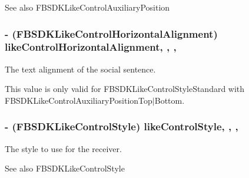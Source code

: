 \begin{DoxySeeAlso}{See also}
F\+B\+S\+D\+K\+Like\+Control\+Auxiliary\+Position 
\end{DoxySeeAlso}
\hypertarget{interface_f_b_s_d_k_like_control_a09b382f7e6805a15fc7eaeaa0ebb8788}{}
\subsubsection[{like\+Control\+Horizontal\+Alignment}]{\setlength{\rightskip}{0pt plus 5cm}-\/ (F\+B\+S\+D\+K\+Like\+Control\+Horizontal\+Alignment) like\+Control\+Horizontal\+Alignment\hspace{0.3cm}{\ttfamily [read]}, {\ttfamily [write]}, {\ttfamily [nonatomic]}, {\ttfamily [assign]}}\label{interface_f_b_s_d_k_like_control_a09b382f7e6805a15fc7eaeaa0ebb8788}
The text alignment of the social sentence.

This value is only valid for F\+B\+S\+D\+K\+Like\+Control\+Style\+Standard with F\+B\+S\+D\+K\+Like\+Control\+Auxiliary\+Position\+Top$\vert$\+Bottom. \hypertarget{interface_f_b_s_d_k_like_control_a4e8264601868efeebbbb247892f95240}{}
\subsubsection[{like\+Control\+Style}]{\setlength{\rightskip}{0pt plus 5cm}-\/ (F\+B\+S\+D\+K\+Like\+Control\+Style) like\+Control\+Style\hspace{0.3cm}{\ttfamily [read]}, {\ttfamily [write]}, {\ttfamily [nonatomic]}, {\ttfamily [assign]}}\label{interface_f_b_s_d_k_like_control_a4e8264601868efeebbbb247892f95240}
The style to use for the receiver.

\begin{DoxySeeAlso}{See also}
F\+B\+S\+D\+K\+Like\+Control\+Style 
\end{DoxySeeAlso}
\hypertarget{interface_f_b_s_d_k_like_control_a19bcd198e1f6697fa9740c82fbd00de9}{}
